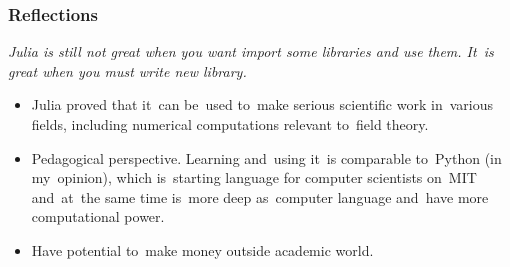\documentclass[10pt,t]{beamer}
\begin{document}
\begin{frame}
  \frametitle{Reflections}


  \textit{Julia is still not great when you want import some libraries
    and use them. It~is great when you must write new library.}




  \begin{itemize}

  \item Julia proved that it~can be~used to~make serious scientific
    work in~various fields, including numerical computations relevant
    to~field theory.

  \item Pedagogical perspective. Learning and~using it~is comparable
    to~Python (in my~opinion), which is~starting language for computer
    scientists on~MIT and~at~the same time is~more deep as~computer
    language and~have more computational power.

  \item Have potential to~make money outside academic world.

  \end{itemize}

\end{frame}
\end{document}
